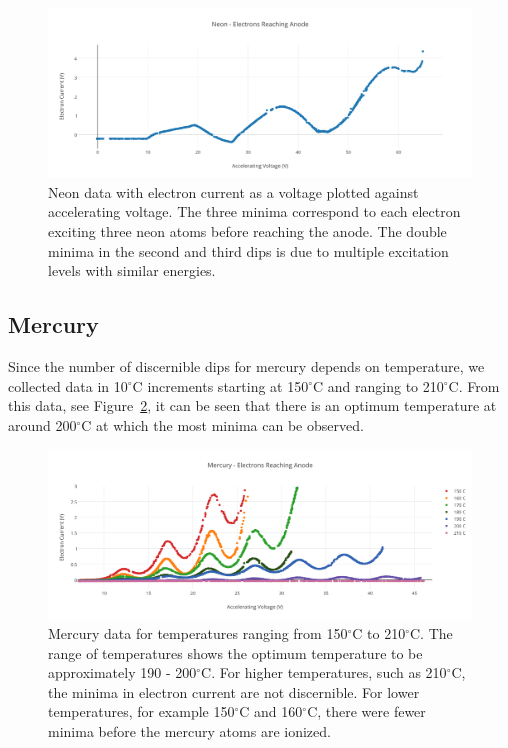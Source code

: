 \documentclass[prb,preprint]{revtex4-1}
\begin{document}
\begin{figure}[h!]
\centering

\includegraphics[width=6in]{neon_data.pdf}
\caption{Neon data with electron current as a voltage plotted against accelerating voltage. The three minima correspond to each electron exciting three neon atoms before reaching the anode. The double minima in the second and third dips is due to multiple excitation levels with similar energies.}

\label{neon_data}
\end{figure}


\subsection{Mercury}

Since the number of discernible dips for mercury depends on temperature, we collected data in 10$^{\circ}$C increments starting at 150$^{\circ}$C and ranging to 210$^{\circ}$C. From this data, see Figure~\ref{hg_data}, it can be seen that there is an optimum temperature at around 200$^{\circ}$C at which the most minima can be observed. 

\begin{figure}[h!]
\centering

\includegraphics[width=6in]{hg_data.pdf}
\caption{Mercury data for temperatures ranging from 150$^{\circ}$C to 210$^{\circ}$C. The range of temperatures shows the optimum temperature to be approximately 190 - 200$^{\circ}$C. For higher temperatures, such as 210$^{\circ}$C, the minima in electron current are not discernible. For lower temperatures, for example 150$^{\circ}$C and 160$^{\circ}$C, there were fewer minima before the mercury atoms are ionized.}

\label{hg_data}
\end{figure}
\end{document}
